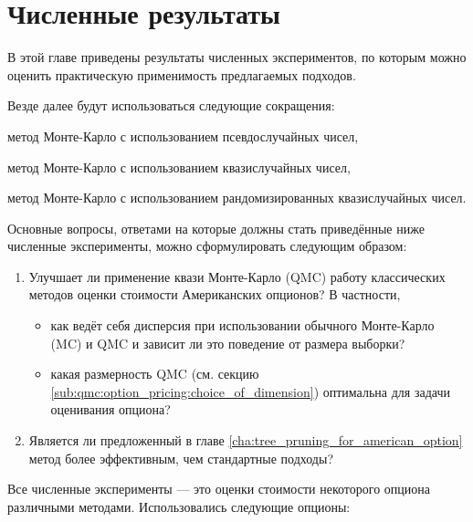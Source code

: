 \chapter{Численные результаты} %
\label{cha:numerical_results}

В этой главе приведены результаты численных экспериментов, по которым можно оценить практическую применимость предлагаемых подходов. 

Везде далее будут использоваться следующие сокращения:
\begin{description}[noitemsep, align=right, labelwidth=\parindent+\widthof{\textbf{RQMC}}]
	\item [MC] метод Монте-Карло с использованием псевдослучайных чисел,
	\item [QMC] метод Монте-Карло с использованием квазислучайных чисел,
	\item [RQMC] метод Монте-Карло с использованием рандомизированных квазислучайных чисел.
\end{description}

Основные вопросы, ответами на которые должны стать приведённые ниже численные эксперименты, можно сформулировать следующим образом:

\begin{enumerate}
	\item Улучшает ли применение квази Монте-Карло (QMC) работу классических методов оценки стоимости Американских опционов? В частности,
	\begin{itemize}
		\item как ведёт себя дисперсия при использовании обычного Монте-Карло (MC) и QMC и зависит ли это поведение от размера выборки?
		\item какая размерность QMC (см. секцию \ref{sub:qmc:option_pricing:choice_of_dimension}) оптимальна для задачи оценивания опциона?
	\end{itemize}
	\item Является ли предложенный в главе \ref{cha:tree_pruning_for_american_option} метод более эффективным, чем стандартные подходы?
\end{enumerate}

Все численные эксперименты --- это оценки стоимости некоторого опциона различными методами. Использовались следующие опционы:

